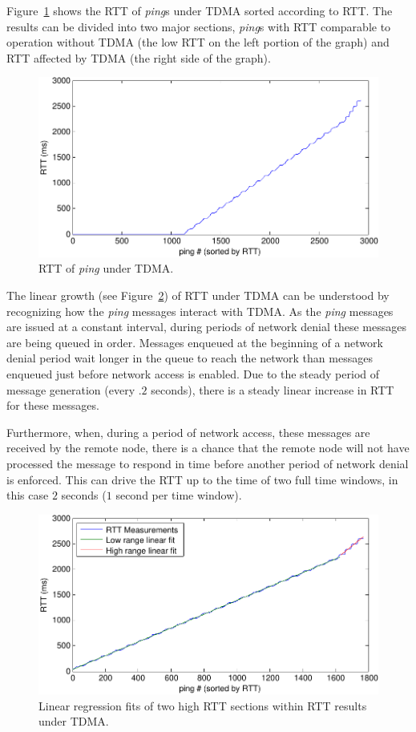 \documentclass[oneside,12pt]{memoir}
\begin{document}
Figure~\ref{fig:rtt_enabled} shows the RTT of \textit{ping}s under TDMA sorted according to RTT. The results can be divided into two major sections, \textit{ping}s with RTT comparable to operation without TDMA (the low RTT on the left portion of the graph) and RTT affected by TDMA (the right side of the graph). 

\begin{figure}
\centering
\includegraphics[scale=0.85]{rtt_enabled.pdf}
\caption{RTT of \textit{ping} under TDMA.}
\label{fig:rtt_enabled}
\end{figure}

The linear growth (see Figure~\ref{fig:rtt_2_fits}) of RTT under TDMA can be understood by recognizing how the \textit{ping} messages interact with TDMA. As the \textit{ping} messages are issued at a constant interval, during periods of network denial these messages are being queued in order. Messages enqueued at the beginning of a network denial period wait longer in the queue to reach the network than messages enqueued just before network access is enabled. Due to the steady period of message generation (every $.2$ seconds), there is a steady linear increase in RTT for these messages. 

Furthermore, when, during a period of network access, these messages are received by the remote node, there is a chance that the remote node will not have processed the message to respond in time before another period of network denial is enforced. This can drive the RTT up to the time of two full time windows, in this case $2$ seconds ($1$ second per time window).

\begin{figure}
\centering
\includegraphics[scale=0.85]{rtt_2_fits.pdf}
\caption{Linear regression fits of two high RTT sections within RTT results under TDMA.}
\label{fig:rtt_2_fits}
\end{figure}
\end{document}
